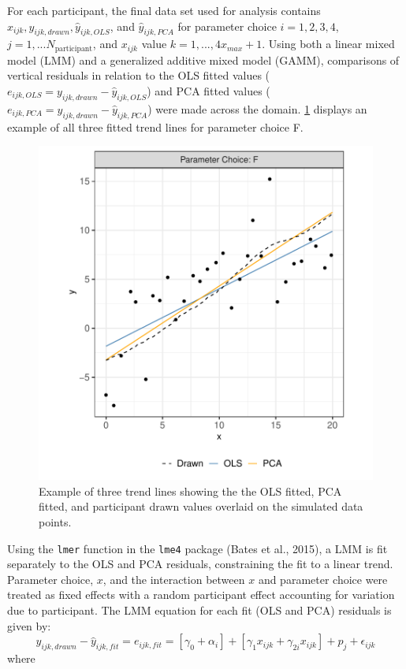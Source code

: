\documentclass[print]{nuthesis}
\begin{document}
For each participant, the final data set used for analysis contains \(x_{ijk}, y_{ijk,drawn}, \hat y_{ijk,OLS}\), and \(\hat y_{ijk,PCA}\) for parameter choice \(i = 1,2,3,4\), \(j = 1,...N_\text{participant}\), and \(x_{ijk}\) value \(k = 1, ...,4 x_{max} + 1\).
Using both a linear mixed model (LMM) and a generalized additive mixed model (GAMM), comparisons of vertical residuals in relation to the OLS fitted values (\(e_{ijk,OLS} = y_{ijk,drawn} - \hat y_{ijk,OLS}\)) and PCA fitted values (\(e_{ijk,PCA} = y_{ijk,drawn} - \hat y_{ijk,PCA}\)) were made across the domain.
\cref{fig:eyefitting-example-plot} displays an example of all three fitted trend lines for parameter choice F.

\begin{figure}[tbp]

{\centering \includegraphics[width=0.7\linewidth,]{thesis_files/figure-latex/eyefitting-example-plot-1} 

}

\caption[Eye Fitting Straight Lines in the Modern Era feedback data example]{Example of three trend lines showing the the OLS fitted, PCA fitted, and participant drawn values overlaid on the simulated data points.}\label{fig:eyefitting-example-plot}
\end{figure}

Using the \texttt{lmer} function in the \texttt{lme4} package (Bates et al., 2015), a LMM is fit separately to the OLS and PCA residuals, constraining the fit to a linear trend.
Parameter choice, \(x\), and the interaction between \(x\) and parameter choice were treated as fixed effects with a random participant effect accounting for variation due to participant.
The LMM equation for each fit (OLS and PCA) residuals is given by:
\begin{equation}
y_{ijk,drawn} - \hat y_{ijk,fit} = e_{ijk,fit} = \left[\gamma_0 + \alpha_i\right] + \left[\gamma_{1} x_{ijk} + \gamma_{2i} x_{ijk}\right] + p_{j} + \epsilon_{ijk}
\end{equation}
\noindent where
\end{document}
